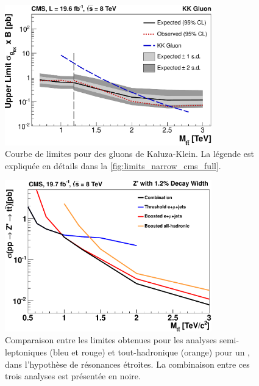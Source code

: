 \begin{figure}[tb]
    \centering
    \includegraphics[width=0.8\textwidth]{chapitre7/figs/limits-kk.pdf}
    \caption{Courbe de limites pour des gluons de Kaluza-Klein. La légende est expliquée en détails dans la \cref{fig:limits_narrow_cms_full}.}
    \label{fig_a1_3}
\end{figure}

\begin{figure}[tb]
    \centering
    \includegraphics[width=0.8\textwidth]{chapitre7/figs/limit_comparison_narrow_resonances.pdf}
    \caption{Comparaison entre les limites obtenues pour les analyses semi-leptoniques (bleu et rouge) et tout-hadronique (orange) pour un \zprime, dans l'hypothèse de résonances étroites. La combinaison entre ces trois analyses est présentée en noire.}
    \label{fig:a1_4}
\end{figure}

